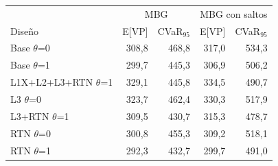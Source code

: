 \begin{tabular}{p{4.6cm}rrrr}
\toprule
 & \multicolumn{2}{c}{MBG} & \multicolumn{2}{c}{MBG con saltos} \\
Diseño & E[VP] & CVaR$_{95}$ & E[VP] & CVaR$_{95}$ \\
\midrule
Base \textbar{} $\theta$=0 & 308,8 & 468,8 & 317,0 & 534,3 \\
Base \textbar{} $\theta$=1 & 299,7 & 445,3 & 306,9 & 506,2 \\
L1X+\allowbreak{}L2+\allowbreak{}L3+\allowbreak{}RTN \textbar{} $\theta$=1 & 329,1 & 445,8 & 334,5 & 490,7 \\
L3 \textbar{} $\theta$=0 & 323,7 & 462,4 & 330,3 & 517,9 \\
L3+\allowbreak{}RTN \textbar{} $\theta$=1 & 309,5 & 430,7 & 315,3 & 478,7 \\
RTN \textbar{} $\theta$=0 & 300,8 & 455,3 & 309,2 & 518,1 \\
RTN \textbar{} $\theta$=1 & 292,3 & 432,7 & 299,7 & 491,0 \\
\bottomrule
\end{tabular}
